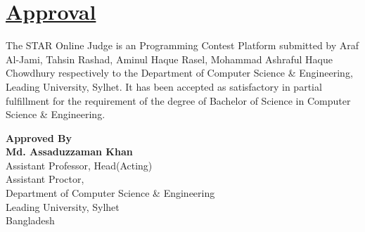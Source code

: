 
\section*{\underline{Approval}}
\vspace{10pt}
The STAR Online Judge is an Programming Contest Platform submitted by Araf Al-Jami, Tahsin Rashad, Aminul Haque Rasel, Mohammad Ashraful Haque Chowdhury respectively to the Department of Computer Science \& Engineering, Leading University, Sylhet. It has been accepted as satisfactory in partial fulfillment for the requirement of the degree of Bachelor of Science in Computer Science \& Engineering. \\

\begin{center}
    \Large{\textbf{Approved By}} \\    
    \large{\textbf{Md. Assaduzzaman Khan}} \\
    Assistant Professor, Head(Acting) \\
    Assistant Proctor,\\
    Department of Computer Science \& Engineering \\
    Leading University, Sylhet \\
    Bangladesh\\
\end{center}

\pagebreak
    
